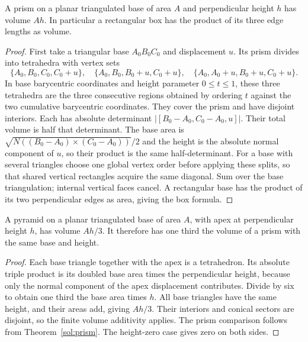 \begin{theorem}\label{sol:prism}
A prism on a planar triangulated base of area $A$ and perpendicular
height $h$ has volume $Ah$. In particular a rectangular box has the
product of its three edge lengths as volume.
\end{theorem}
\begin{proof}
First take a triangular base $A_0B_0C_0$ and displacement $u$.
Its prism divides into tetrahedra with vertex sets
\[
 \{A_0,B_0,C_0,C_0+u\},\quad
 \{A_0,B_0,B_0+u,C_0+u\},\quad
 \{A_0,A_0+u,B_0+u,C_0+u\}.
\]
In base barycentric coordinates and height parameter $0\le t\le1$,
these three tetrahedra are the three consecutive regions obtained by
ordering $t$ against the two cumulative barycentric coordinates. They
cover the prism and have disjoint interiors. Each has absolute determinant
$|[B_0-A_0,C_0-A_0,u]|$. Their total volume is half that determinant.
The base area is $\sqrt{N((B_0-A_0)\times(C_0-A_0))}/2$ and
the height is the absolute normal component of $u$, so their product
is the same half-determinant. For a base with several triangles choose
one global vertex order before applying these splits, so that shared
vertical rectangles acquire the same diagonal. Sum over the base triangulation; internal
vertical faces cancel. A rectangular base has the product of its two
perpendicular edges as area, giving the box formula.
\end{proof}

\begin{theorem}\label{sol:pyramid}
A pyramid on a planar triangulated base of area $A$, with apex at
perpendicular height $h$, has volume $Ah/3$. It therefore has one third
the volume of a prism with the same base and height.
\end{theorem}
\begin{proof}
Each base triangle together with the apex is a tetrahedron. Its absolute
triple product is its doubled base area times the perpendicular height,
because only the normal component of the apex displacement contributes.
Divide by six to obtain one third the base area times $h$.
All base triangles have the same height, and their areas add, giving
$Ah/3$. Their interiors and conical sectors are disjoint, so the finite
volume additivity applies. The prism comparison follows from
Theorem~\ref{sol:prism}. The height-zero case gives zero on both sides.
\end{proof}

